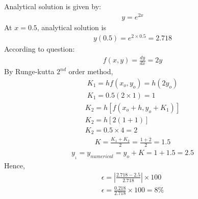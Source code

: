 \documentclass[journal,12pt,twocolumn]{IEEEtran}
\theoremstyle{remark}
\begin{document}
Analytical solution is given by:
\begin{align}
    y = e^{2x}
\end{align}
At $x = 0.5$, analytical solution is 
\begin{align}
    y(0.5) = e^{2\times 0.5} = 2.718 
\end{align}
According to question:
\begin{align}
    f(x,y) = \frac{dy}{dx} = 2y
\end{align}
By Runge-kutta $2^{nd}$ order method, 
\begin{align}
    K_1 = hf(x_o,y_o) = h(2y_o)\\
    K_1 = 0.5(2 \times 1) = 1
\end{align}
\begin{align}
    K_2 = h[f(x_o + h, y_o + K_1)]\\
    K_2 = h[2(1 +1)]\\
    K_2 = 0.5 \times 4 = 2 
\end{align}
\begin{align}
    K = \frac{K_1 + K_2}{2} = \frac{1 +2}{2} = 1.5
\end{align}
\begin{align}
    y_{_{1}} = y_{numerical} = y_o + K = 1 + 1.5 = 2.5 
\end{align}
Hence, 
\begin{align}
    \epsilon = \left|\frac{2.718 - 2.5}{2.718}\right| \times 100 \\
    \epsilon = \frac{0.218}{2.718}\times 100 = 8\%
 \end{align}


\end{document}
